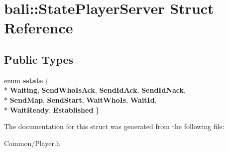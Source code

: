 \hypertarget{structbali_1_1_state_player_server}{\section{bali\-:\-:State\-Player\-Server Struct Reference}
\label{structbali_1_1_state_player_server}
}
\subsection*{Public Types}
\begin{DoxyCompactItemize}
\item 
enum {\bfseries sstate} \{ \\*
{\bfseries Waiting}, 
{\bfseries Send\-Who\-Is\-Ack}, 
{\bfseries Send\-Id\-Ack}, 
{\bfseries Send\-Id\-Nack}, 
\\*
{\bfseries Send\-Map}, 
{\bfseries Send\-Start}, 
{\bfseries Wait\-Who\-Is}, 
{\bfseries Wait\-Id}, 
\\*
{\bfseries Wait\-Ready}, 
{\bfseries Established}
 \}
\end{DoxyCompactItemize}


The documentation for this struct was generated from the following file\-:\begin{DoxyCompactItemize}
\item 
Common/Player.\-h\end{DoxyCompactItemize}
